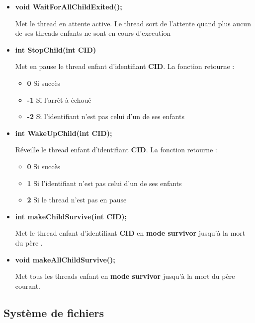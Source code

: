 \documentclass{article}
\begin{document}
\begin{itemize}
  \item 
  \textbf{void WaitForAllChildExited();}
  
  Met le thread en attente active. Le thread sort de l'attente quand plus aucun de ses threads enfants ne sont en cours d'execution
  
  \item 
  \textbf{int StopChild(int CID)}
  
  Met en pause le thread enfant d'identifiant \textbf{CID}. 
  La fonction retourne :    
    \begin{itemize}
      \item \textbf{0} Si succès
      \item \textbf{-1} Si l'arrêt à échoué
      \item \textbf{-2} Si l'identifiant n'est pas celui d'un de ses enfants
    \end{itemize}       
    
  
  \item 
  \textbf{int WakeUpChild(int CID);}
  
    
  Réveille le thread enfant d'identifiant \textbf{CID}.
  La fonction retourne :    
    \begin{itemize}
      \item \textbf{0} Si succès
      \item \textbf{1} Si l'identifiant n'est pas celui d'un de ses enfants
      \item \textbf{2} Si le thread n'est pas en pause
    \end{itemize} 


  \item 
  \textbf{int makeChildSurvive(int CID);}
  
  Met le thread enfant d'identifiant \textbf{CID} en \textbf{mode survivor} jusqu'à la mort du père .
  
  \item 
  \textbf{void makeAllChildSurvive();}
  
  Met tous les threads enfant en \textbf{mode survivor} jusqu'à la mort du père courant.
\end{itemize}

\subsection{Système de fichiers}
\end{document}

